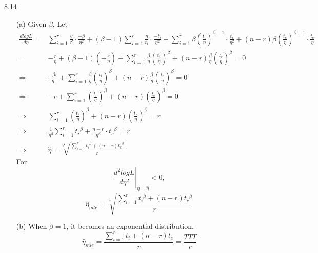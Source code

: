 \documentclass[paper=a4, fontsize=11pt]{scrartcl} %
\numberwithin{equation}{section} %
\numberwithin{figure}{section} %
\numberwithin{table}{section} %
\begin{document}
8.14
\begin{itemize}
	\item[(a)]	Given $\beta$, Let
			\begin{align*}
				\frac{dlogL}{d\eta} 	=&	\sum_{i = 1}^r \frac{\eta}{\beta}\cdot\frac{-\beta}{\eta^2} + (\beta - 1)\sum_{i = 1}^r \frac{\eta}{t_i}\cdot\frac{-t_i}{\eta^2} + \sum_{i = 1}^r\beta\left( \frac{t_i}{\eta} \right)^{\beta -1}\cdot\frac{t_i}{\eta^2} + (n-r)\beta \left( \frac{t_c}{\eta} \right)^{\beta -1}\cdot\frac{t_c}{\eta} \\
								=&	-\frac{r}{\eta} + (\beta -1)\left( -\frac{r}{\eta} \right) + \sum_{i = 1}^r \frac{\beta}{\eta}\left( \frac{t_i}{\eta} \right)^\beta + (n-r)\frac{\beta}{\eta}\left( \frac{t_c}{\eta} \right)^\beta = 0\\
						\Rightarrow&	\frac{-\beta r}{\eta} + \sum_{i = 1}^r \frac{\beta}{\eta}\left( \frac{t_i}{\eta} \right)^\beta + (n-r)\frac{\beta}{\eta}\left( \frac{t_c}{\eta} \right)^\beta = 0 \\
						\Rightarrow&	- r + \sum_{i = 1}^r \left( \frac{t_i}{\eta} \right)^\beta + (n-r)\left( \frac{t_c}{\eta} \right)^\beta = 0 \\
						\Rightarrow&	\sum_{i = 1}^r \left( \frac{t_i}{\eta} \right)^\beta + (n-r)\left( \frac{t_c}{\eta} \right)^\beta = r	\\ 
						\Rightarrow&	\frac{1}{\eta^\beta}\sum_{i = 1}^r {t_i}^\beta + \frac{n-r}{\eta^\beta}\cdot {t_c}^\beta = r\\
						\Rightarrow&	\widehat{\eta} = \sqrt[\beta]{\frac{\sum_{i = 1}^{r}{t_i}^\beta + (n-r){t_c}^\beta}{r}}
			\end{align*}
			For $$\left.\frac{d^2 logL}{d\eta^2}\right|_{\eta = \widehat{\eta}} < 0, $$
			$$\widehat{\eta}_{mle} = \sqrt[\beta]{\frac{\sum_{i = 1}^{r}{t_i}^\beta + (n-r){t_c}^\beta}{r}}$$
	\item[(b)]	When $\beta = 1$, it becomes an exponential distribution. 
			$$\widehat{\eta}_{mle} = \frac{\sum_{i = 1}^{r}{t_i} + (n-r){t_c}}{r} = \frac{TTT}{r}$$
\end{itemize}
\end{document}
